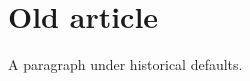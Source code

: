 \documentclass[lang=zh]{impeart}
\begin{document}
\section{Old article}
A paragraph under historical defaults.
\end{document}
